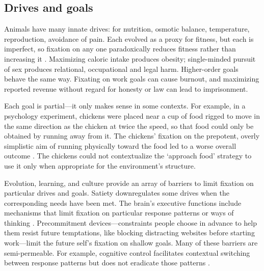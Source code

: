 \documentclass[11pt]{article}
\begin{document}


\subsection*{Drives and goals}

Animals have many innate drives: for nutrition, osmotic balance, temperature, reproduction, avoidance of pain. Each evolved as a proxy for fitness, but each is imperfect, so fixation on any one paradoxically reduces fitness rather than increasing it \citep{john2023dead, mcfarland1975behavioural}. Maximizing caloric intake produces obesity; single-minded pursuit of sex produces relational, occupational and legal harm. Higher-order goals behave the same way. Fixating on work goals can cause burnout, and maximizing reported revenue without regard for honesty or law can lead to imprisonment. 

Each goal is partial---it only makes sense in some contexts. For example, in a psychology experiment, chickens were placed near a cup of food rigged to move in the same direction as the chicken at twice the speed, so that food could only be obtained by running away from it. The chickens' fixation on the prepotent, overly simplistic aim of running physically toward the food led to a worse overall outcome \citep{hershberger1986approach, dayan2006misbehavior}. The chickens could not contextualize the `approach food' strategy to use it only when appropriate for the environment's structure.

Evolution, learning, and culture provide an array of barriers to limit fixation on particular drives and goals. Satiety downregulates some drives when the corresponding needs have been met. The brain's executive functions include mechanisms that limit fixation on particular response patterns or ways of thinking \citep{miller2001integrative, diamond2013executive}. Precommitment devices---constraints people choose in advance to help them resist future temptations, like blocking distracting websites before starting work---limit the future self's fixation on shallow goals. Many of these barriers are semi-permeable. For example, cognitive control facilitates contextual switching between response patterns but does not eradicate those patterns \citep{miller2001integrative}.
\end{document}
